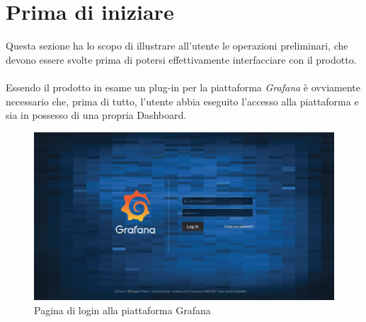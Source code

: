 \section{Prima di iniziare}\label{PreStart}

Questa sezione ha lo scopo di illustrare all'utente le operazioni preliminari, che devono essere svolte prima di potersi effettivamente interfacciare con il prodotto.\\
~\\
Essendo il prodotto in esame un plug-in per la piattaforma \textit{Grafana} è ovviamente necessario che, prima di tutto, l'utente abbia eseguito l'accesso alla piattaforma e sia in possesso di una propria Dashboard\glossario.

\begin{figure}[H]
	\begin{center}
		\includegraphics[scale=0.3]{./images/GrafanaLogin.png}
		 \caption{Pagina di login alla piattaforma Grafana}	
		 \label{GrafanaLogin}
	\end{center}
\end{figure}
\pagebreak



\pagebreak
